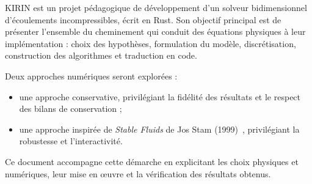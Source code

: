 KIRIN est un projet pédagogique de développement d'un solveur
bidimensionnel d'écoulements incompressibles, écrit en Rust.
Son objectif principal est de présenter l'ensemble du cheminement
qui conduit des équations physiques à leur implémentation :
choix des hypothèses, formulation du modèle, discrétisation,
construction des algorithmes et traduction en code.

Deux approches numériques seront explorées :
\begin{itemize}
    \item une approche conservative, privilégiant la fidélité
    des résultats et le respect des bilans de conservation ;

    \item une approche inspirée de \textit{Stable Fluids}
    de Jos Stam (1999)~\cite{stam1999stable}, privilégiant la robustesse et l'interactivité.
\end{itemize}

Ce document accompagne cette démarche en explicitant les choix
physiques et numériques, leur mise en œuvre et la vérification
des résultats obtenus.
